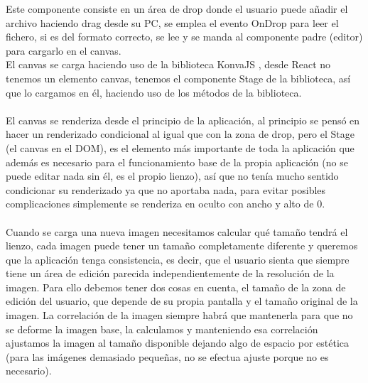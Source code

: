 Este componente consiste en un área de drop donde el usuario puede añadir el archivo 
haciendo drag desde su PC, se emplea el evento OnDrop para leer el fichero, si es
del formato correcto, se lee y se manda al componente padre (editor) para cargarlo en 
el canvas.
\\
El canvas se carga haciendo uso de la biblioteca KonvaJS \cite{KonvaJS}, desde React 
no tenemos un elemento canvas, tenemos el componente Stage de la biblioteca, así que 
lo cargamos en él, haciendo uso de los métodos de la biblioteca.
\\\\
El canvas se renderiza desde el principio de la aplicación, al principio se pensó 
en hacer un renderizado condicional al igual que con la zona de drop, pero el Stage
(el canvas en el DOM), es el elemento más importante de toda la aplicación
que además es necesario para el funcionamiento base de la propia aplicación 
(no se puede editar nada sin él, es el propio lienzo), así que no tenía mucho sentido
condicionar su renderizado ya que no aportaba nada,
para evitar posibles complicaciones simplemente se renderiza en oculto con ancho y alto
de 0.
\\\\
Cuando se carga una nueva imagen necesitamos calcular qué tamaño tendrá el lienzo, 
cada imagen puede tener un tamaño completamente diferente y queremos que la aplicación
tenga consistencia, es decir, que el usuario sienta que siempre tiene un área de edición
parecida independientemente de la resolución de la imagen.
Para ello debemos tener dos cosas en cuenta, el tamaño de la zona de edición del usuario,
que depende de su propia pantalla y el tamaño original de la imagen.
La correlación de la imagen siempre habrá que mantenerla para que no se deforme la 
imagen base, la calculamos y manteniendo esa correlación ajustamos la imagen al tamaño
disponible dejando algo de espacio por estética (para las imágenes demasiado pequeñas, 
no se efectua ajuste porque no es necesario).

